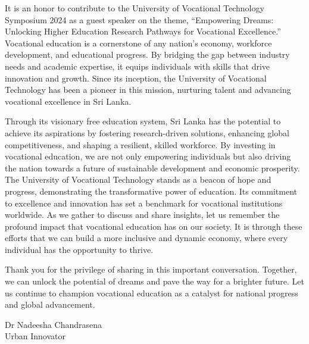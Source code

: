 \thispagestyle{fancy}
	




   
    



	


It is an honor to contribute to the University of Vocational Technology Symposium 2024 as a guest speaker on the theme, “Empowering Dreams: Unlocking Higher Education Research Pathways for Vocational Excellence.”
Vocational education is a cornerstone of any nation’s economy, workforce development, and educational progress. By bridging the gap between industry needs and academic expertise, it equips individuals with skills that drive innovation and growth. Since its inception, the University of Vocational Technology has been a pioneer in this mission, nurturing talent and advancing vocational excellence in Sri Lanka.

Through its visionary free education system, Sri Lanka has the potential to achieve its aspirations by fostering research-driven solutions, enhancing global competitiveness, and shaping a resilient, skilled workforce. By investing in vocational education, we are not only empowering individuals but also driving the nation towards a future of sustainable development and economic prosperity.
The University of Vocational Technology stands as a beacon of hope and progress, demonstrating the transformative power of education. Its commitment to excellence and innovation has set a benchmark for vocational institutions worldwide. As we gather to discuss and share insights, let us remember the profound impact that vocational education has on our society. It is through these efforts that we can build a more inclusive and dynamic economy, where every individual has the opportunity to thrive.

Thank you for the privilege of sharing in this important conversation. Together, we can unlock the potential of dreams and pave the way for a brighter future. Let us continue to champion vocational education as a catalyst for national progress and global advancement.

\vspace{1cm}
	\noindent
    

Dr Nadeesha Chandrasena \\
Urban Innovator
	
	\newpage
	